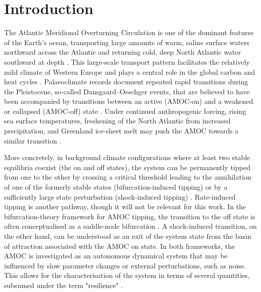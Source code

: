 \documentclass[12pt, a4paper]{article}
\begin{document}
\section{Introduction}
\label{sec:intro}

The Atlantic Meridional Overturning Circulation is one of the dominant features of the Earth's ocean, transporting large amounts of warm, saline surface waters northward across the Atlantic and returning cold, deep North Atlantic water southward at depth \citep{Talley2003DataBasedMeridionalOverturning, Johns2023AMOCHeatTransport}. This large-scale transport pattern facilitates the relatively mild climate of Western Europe and plays a central role in the global carbon and heat cycles \citep{Ganachaud2000ImprovedEstimatesGlobal, Jackson2015AMOCImpact, Schaumann2025AMOCCarbonCosts}. Palaeoclimate records document repeated rapid transitions during the Pleistocene, so-called Dansgaard–Oeschger events, that are believed to have been accompanied by transitions between an active (AMOC-on) and a weakened or collapsed (AMOC-off) state \citep{Dansgaard1984DO, Clark2002AMOCAbruptClimate, Menviel2020DOIceOscillation}. Under continued anthropogenic forcing, rising sea surface temperatures, freshening of the North Atlantic from increased precipitation, and Greenland ice-sheet melt may push the AMOC towards a similar transition \citep{Yang2016AMOCFreshwater, Lohmann2021RiskTippingOverturning, ArmstrongMcKay2022TippingPoints, VanWesten2024PhysicsBasedEWS}.

More concretely, in background climate configurations where at least two stable equilibria coexist (the on and off states), the system can be permanently tipped from one to the other by crossing a critical threshold leading to the annihilation of one of the formerly stable states (bifurcation-induced tipping) or by a sufficiently large state perturbation (shock-induced tipping) \citep{Ashwin2012tipTypes, Alkhayuon2019AMOCRateTipping}. Rate-induced tipping is another pathway, though it will not be relevant for this work. In the bifurcation-theory framework for AMOC tipping, the transition to the off state is often conceptualised as a saddle-node bifurcation \citep{Stommel1961CircModel,VanWesten2025SaddleNodeAMOC}. A shock-induced transition, on the other hand, can be understood as an exit of the system state from the basin of attraction associated with the AMOC on state. In both frameworks, the AMOC is investigated as an autonomous dynamical system that may be influenced by slow parameter changes or external perturbations, such as noise. This allows for the characterisation of the system in terms of several quantities, subsumed under the term "resilience" \citep{Krakovska2024ResilienceDynamicalSystems}.
\end{document}
